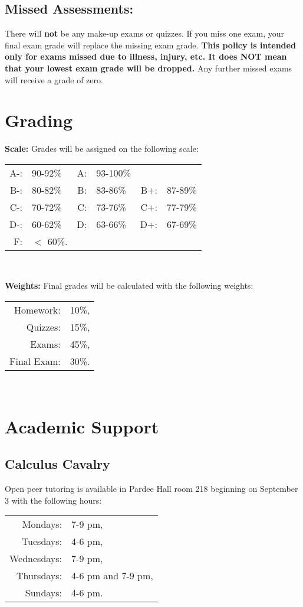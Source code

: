 \documentclass[12pt]{amsart}
\begin{document}
\subsection*{Missed Assessments:}
There will {\bf not} be any make-up exams or quizzes.
If you miss one exam, your final exam grade will replace the missing exam grade.
\textbf{This policy is intended only for exams missed due to illness, injury, etc.  
  It does NOT mean that your lowest exam grade will be dropped.}
Any further missed exams will receive a grade of zero.

\section*{Grading}
\noindent\textbf{Scale:}
Grades will be assigned on the following scale:
\begin{center}
  \begin{tabular}{rlrlrl}
    A-: & 90-92\% & A: &93-100\%\\
    B-: & 80-82\% & B: & 83-86\% & B+: &87-89\%\\
    C-: & 70-72\% & C: & 73-76\% & C+: &77-79\%\\
    D-: & 60-62\% & D: & 63-66\% & D+: &67-69\%\\
    F: & $<$ 60\%.\\
  \end{tabular}\\
\end{center}
\textbf{Weights:}
Final grades will be calculated with the following weights:
\begin{center}
  \begin{tabular}{rl}
    Homework: & 10\%,\\
    Quizzes: &15\%,\\
    Exams: & 45\%,\\
    Final Exam: & 30\%.\\
  \end{tabular}\\
\end{center}

\section*{Academic Support}
\subsection*{Calculus Cavalry}
\noindent
Open peer tutoring is available in Pardee Hall room 218 beginning on September 3 with the following hours:
\begin{center}
  \begin{tabular}{rl}
    Mondays: &7-9 pm,\\
    Tuesdays: &4-6 pm,\\
    Wednesdays: &7-9 pm,\\
    Thursdays: &4-6 pm and 7-9 pm,\\
    Sundays: &4-6 pm.
  \end{tabular}
\end{center}
\end{document}
